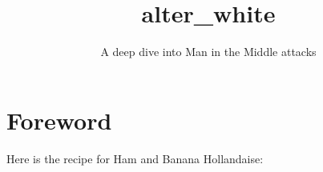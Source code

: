 \documentclass{42-en}
\begin{document}
        \title{alter\_white}
        \subtitle{A deep dive into Man in the Middle attacks}
\maketitle
\tableofcontents
\newpage
\chapter{Foreword}

    Here is the recipe for Ham and Banana Hollandaise:\\
\end{document}
